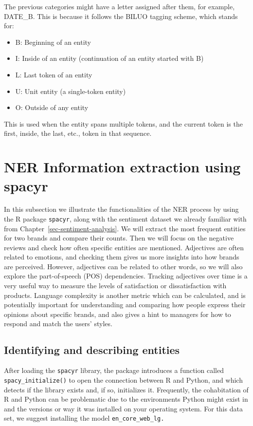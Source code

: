 The previous categories might have a letter assigned after them, for
example, DATE\_B. This is because it follows the BILUO tagging scheme,
which stands for:

\begin{itemize}
\tightlist
\item
  B: Beginning of an entity
\item
  I: Inside of an entity (continuation of an entity started with B)
\item
  L: Last token of an entity
\item
  U: Unit entity (a single-token entity)
\item
  O: Outside of any entity
\end{itemize}

This is used when the entity spans multiple tokens, and the current
token is the first, inside, the last, etc., token in that sequence.

\section{NER Information extraction using
spacyr}\label{ner-information-extraction-with-spacyr}

In this subsection we illustrate the functionalities of the NER process by using the R package \texttt{spacyr}, along with
the sentiment dataset we already familiar with from
Chapter~\ref{sec-sentiment-analysis}. We will extract the most frequent
entities for two brands and compare their counts. Then we will
focus on the negative reviews and check how often specific entities are
mentioned. Adjectives are often related to emotions, and checking them gives us
more insights into how brands are perceived. However, adjectives can be related to
other words, so we will also explore the part-of-speech (POS) dependencies.
Tracking adjectives over time is a very useful way to measure the levels of
satisfaction or dissatisfaction with products. Language complexity is
another metric which can be calculated, and is potentially important for
understanding and comparing how people express their opinions about
specific brands, and also gives a hint to managers for how to respond and match
the users' styles.

\subsection{Identifying and describing
entities}\label{identifying-and-describing-entities}

After loading the \texttt{spacyr} library, the package
introduces a function called \texttt{spacy\_initialize()} to open the
connection between R and Python, and which detects if the library exists and, if so,
initializes it. Frequently, the cohabitation of R and Python can be
problematic due to the environments Python might exist in and the versions or
way it was installed on your operating system. For this
data set, we suggest installing the model \texttt{en\_core\_web\_lg.}

